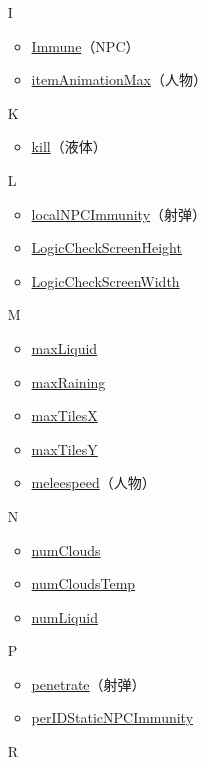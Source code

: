 \begin{multicols}{2}[]
{\begin{itemize}
\begin{itemize}
	\item \hyperref[sec29]{hurtCooldowns}（人物）
	\end{itemize}
\item[I] \begin{itemize}
	\item \hyperref[sec24]{Immune}（NPC）
	\item \hyperref[sec28]{itemAnimationMax}（人物）
	\end{itemize}
\item[K] \begin{itemize}
	\item \hyperref[tab10]{kill}（液体）
	\end{itemize}
\item[L] \begin{itemize}
	\item \hyperref[sec26]{localNPCImmunity}（射弹）
	\item \hyperref[tab9]{LogicCheckScreenHeight}
	\item \hyperref[tab9]{LogicCheckScreenWidth}
	\end{itemize}
\item[M] \begin{itemize}
	\item \hyperref[tab10]{maxLiquid}
	\item \href{https://www.bbstr.net/threads/133/#post-623}{maxRaining}
	\item \hyperref[tab8]{maxTilesX}
	\item \hyperref[tab8]{maxTilesY}
	\item \hyperref[sec28]{meleespeed}（人物）
	\end{itemize}
\item[N] \begin{itemize}
	\item \href{https://www.bbstr.net/threads/133/#post-623}{numClouds}
	\item \href{https://www.bbstr.net/threads/133/#post-623}{numCloudsTemp}
	\item \hyperref[tab10]{numLiquid}
	\end{itemize}
\item[P] \begin{itemize}
	\item \hyperref[sec25]{penetrate}（射弹）
	\item \hyperref[sec27]{perIDStaticNPCImmunity}
	\end{itemize}
\item[R] \begin{itemize}

\end{itemize}
\end{itemize}}
\end{multicols}

